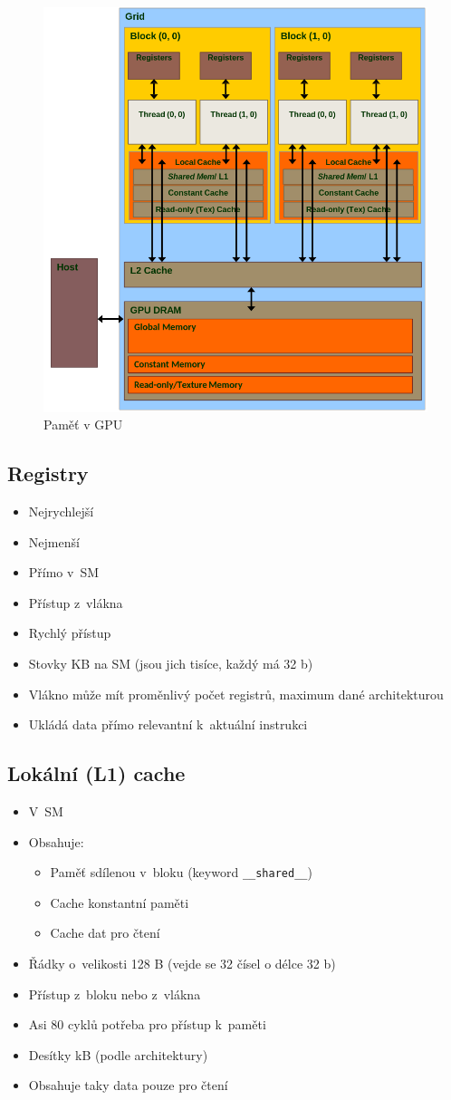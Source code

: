\begin{figure}
    \centering
    \includegraphics[width=0.6\linewidth]{MPC-PZP/pict/mem.png}
    \caption{Paměť v GPU}
    \label{fig:enter-label}
\end{figure}
\subsection{Registry}
\begin{itemize}
    \item Nejrychlejší
    \item Nejmenší
    \item Přímo v~SM
    \item Přístup z~vlákna
    \item Rychlý přístup
    \item Stovky KB na SM (jsou jich tisíce, každý má 32 b)
    \item Vlákno může mít proměnlivý počet registrů, maximum dané architekturou
    \item Ukládá data přímo relevantní k~aktuální instrukci
\end{itemize}

\subsection{Lokální (L1) cache}
\begin{itemize}
    \item V~SM
    \item Obsahuje:
    \begin{itemize}
        \item Paměť sdílenou v~bloku (keyword \texttt{\_\_shared\_\_})
        \item Cache konstantní paměti
        \item Cache dat pro čtení
    \end{itemize}
    \item Řádky o~velikosti 128 B (vejde se 32 čísel o délce 32 b)
    \item Přístup z~bloku nebo z~vlákna
    \item Asi 80 cyklů potřeba pro přístup k~paměti
    \item Desítky kB (podle architektury)
    \item Obsahuje taky data pouze pro čtení
\end{itemize}

